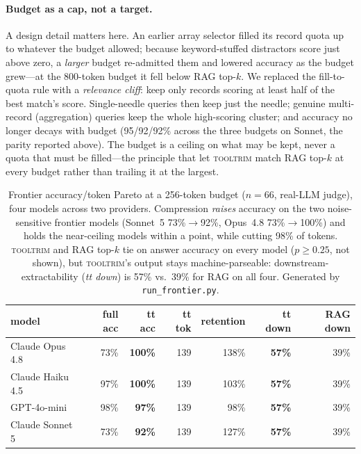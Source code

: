 \documentclass[11pt]{article}
\newcommand{\tooltrim}{\textsc{tooltrim}}
\begin{document}
\paragraph{Budget as a cap, not a target.} A design detail matters here. An
earlier array selector filled its record quota up to whatever the budget allowed;
because keyword-stuffed distractors score just above zero, a \emph{larger} budget
re-admitted them and lowered accuracy as the budget grew---at the 800-token budget
it fell below RAG top-$k$. We replaced the fill-to-quota rule with a
\emph{relevance cliff}: keep only records scoring at least half of the best
match's score. Single-needle queries then keep just the needle; genuine
multi-record (aggregation) queries keep the whole high-scoring cluster; and
accuracy no longer decays with budget (95/92/92\% across the three budgets on
Sonnet, the parity reported above). The budget is a ceiling on what may be kept,
never a quota that must be filled---the principle that let \tooltrim{} match RAG
top-$k$ at every budget rather than trailing it at the largest.

\begin{table}[t]
\centering
\begin{tabular}{lrrrrrr}
\toprule
model & full acc & tt acc & tt tok & retention & tt down & RAG down \\
\midrule
Claude Opus 4.8  & 73\% & \textbf{100\%} & 139 & 138\% & \textbf{57\%} & 39\% \\
Claude Haiku 4.5 & 97\% & \textbf{100\%} & 139 & 103\% & \textbf{57\%} & 39\% \\
GPT-4o-mini      & 98\% & \textbf{97\%}  & 139 & 98\%  & \textbf{57\%} & 39\% \\
Claude Sonnet 5  & 73\% & \textbf{92\%}  & 139 & 127\% & \textbf{57\%} & 39\% \\
\bottomrule
\end{tabular}
\caption{Frontier accuracy/token Pareto at a 256-token budget ($n{=}66$,
real-LLM judge), four models across two providers. Compression \emph{raises}
accuracy on the two noise-sensitive frontier models (Sonnet~5 73\%$\rightarrow$92\%,
Opus~4.8 73\%$\rightarrow$100\%) and holds the near-ceiling models within a point,
while cutting 98\% of tokens. \tooltrim{} and RAG top-$k$ tie on answer accuracy on
every model ($p\geq 0.25$, not shown), but \tooltrim's output stays
machine-parseable: downstream-extractability (\emph{tt down}) is 57\% vs.\ 39\%
for RAG on all four. Generated by \texttt{run\_frontier.py}.}
\label{tab:pareto}
\end{table}
\end{document}
